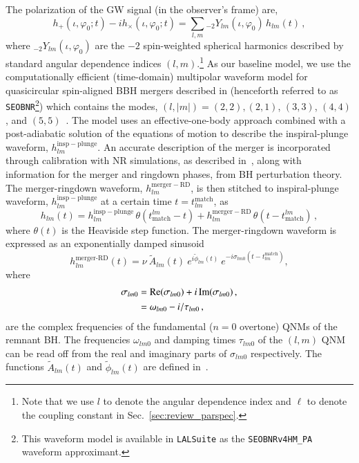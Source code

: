 \documentclass[twocolumn,
               prd,
               aps,
               superscriptaddress,
               tightenlines,
               nofootinbib,
               eqsecnum,
               amsfonts,
               amsmath,
               longbibliography]{revtex4-1}
\newcommand{\SEOB}{\texttt{SEOBNR}}
\begin{document}
The polarization of the GW signal (in the observer's frame) are,
%
\begin{equation}
h_+(\iota,\varphi_0;t ) - i h_\times(\iota,\varphi_0;t) = \sum_{l, m} {}_{-\!2}Y_{l m}(\iota,\varphi_0)\, h_{l m}(t)\,,
\end{equation}
%
where ${}_{-\!2}Y_{l m}(\iota,\varphi_0)$ are the $-2$ spin-weighted spherical harmonics described by standard angular dependence indices $(l,m)$.\footnote{Note that we use $l$ to denote the angular dependence index and $\ell$ to denote the coupling constant in Sec.~\ref{sec:review_parspec}.} As our baseline model, we use the computationally efficient (time-domain) multipolar waveform model for quasicircular spin-aligned BBH mergers described in \cite{Mihaylov:2021bpf} (henceforth referred to as \SEOB{}\footnote{This waveform model is available in \texttt{LALSuite} \cite{lalsuite} as the \texttt{SEOBNRv4HM\_PA} waveform approximant.}) which contains the modes, $(l, |m|)=(2,2),(2,1)$, $(3,3)$, $(4,4)$, and $(5,5)$~\cite{Cotesta:2018fcv,Mihaylov:2021bpf}. The model uses an effective-one-body approach combined with a post-adiabatic solution of the equations of motion to describe the inspiral-plunge waveform, $h_{l m}^\mathrm{insp-plunge}$. An accurate description of the merger is incorporated through calibration with NR simulations, as described in~\cite{Cotesta:2018fcv}, along with information for the merger and ringdown phases, from BH perturbation theory. The merger-ringdown waveform, $h_{l m}^\mathrm{merger-RD}$, is then stitched to inspiral-plunge waveform, $h_{l m}^\mathrm{insp-plunge}$ at a certain time $t = t^{\textrm{match}}_{l m}$, as
%
\begin{equation}
h_{l m}(t) = h_{l m}^\mathrm{insp-plunge}\, \theta(t_\mathrm{match}^{l m} - t) + h_{l m}^\mathrm{merger-RD}\,\theta(t-t_\mathrm{match}^{l m})\,,
\end{equation}
%
where $\theta(t)$ is the Heaviside step function. The merger-ringdown waveform is expressed as an exponentially damped sinusoid~\citep{Bohe:2016gbl,Cotesta:2018fcv,Mihaylov:2021bpf}
%
\begin{equation}
\label{RD}
h_{l m}^{\textrm{merger-RD}}(t) = \nu \ \tilde{A}_{l m}(t)\ e^{i \tilde{\phi}_{l m}(t)} \ e^{-i \sigma_{l m 0}(t-t^{\textrm{match}}_{l m})},
\end{equation}
%
where
%
\begin{align}
\sigma_{l m 0} &= {\rm Re}(\sigma_{l m 0}) + i \, {\rm Im}(\sigma_{l m 0})\,,
\nonumber \\
&= \omega_{l m 0} - i / \tau_{l m 0}\,,
\end{align}
%
are the complex frequencies of the fundamental ($n=0$ overtone) QNMs of the remnant BH.
%
The frequencies $\omega_{l m 0}$ and damping times $\tau_{l m 0}$ of the $(l,
m)$ QNM can be read off from the real and imaginary parts of $\sigma_{l m 0}$
respectively.
%
The functions $\tilde{A}_{l m}(t)$ and $\tilde{\phi}_{l m}(t)$ are defined in~\cite{Bohe:2016gbl,Cotesta:2018fcv}.
\end{document}
